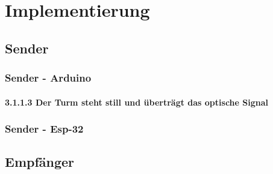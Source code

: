 \chapter{Implementierung}
\label{cha:implmentation}


\section{Sender}

\subsection{Sender - Arduino}
 


 \subsubsection{3.1.1.3 Der Turm steht still und überträgt das optische Signal }

\subsection{Sender - Esp-32}


\section{Empfänger}




